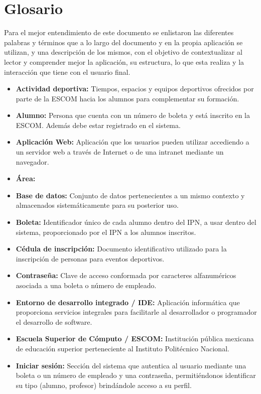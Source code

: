 \chapter*{Glosario}
	Para el mejor entendimiento de este documento se enlistaron las diferentes palabras y términos que a lo largo del documento y en la propia aplicación se utilizan, y una descripción de los mismos, con el objetivo de contextualizar al lector y comprender mejor la aplicación, su estructura, lo que esta realiza y la interacción que tiene con el usuario final.
	\begin{itemize}
		\item \textbf{Actividad deportiva:} Tiempos, espacios y equipos deportivos ofrecidos por parte de la ESCOM hacia los alumnos para complementar su formación.
		\item \textbf{Alumno:} Persona que cuenta con un número de boleta y está inscrito en la ESCOM. Además debe estar registrado en el sistema. 
		\item \textbf{Aplicación Web:} Aplicación que los usuarios pueden utilizar accediendo a un servidor web a través de Internet o de una intranet mediante un navegador.
		\item \textbf{Área:}
		\item \textbf{Base de datos:} Conjunto de datos pertenecientes a un mismo contexto y almacenados sistemáticamente para su posterior uso. 
		\item \textbf{Boleta:} Identificador único de cada alumno dentro del IPN, a usar dentro del sistema, proporcionado por el IPN a los alumnos inscritos. 
		\item \textbf{Cédula de inscripción:} Documento identificativo utilizado para la inscripción de personas para eventos deportivos.
		\item \textbf{Contraseña:} Clave de acceso conformada por caracteres alfanuméricos asociada a una boleta o número de empleado.
		\item \textbf{Entorno de desarrollo integrado / IDE:} Aplicación informática que proporciona servicios integrales para facilitarle al desarrollador o programador el desarrollo de software. 
		\item \textbf{Escuela Superior de Cómputo / ESCOM:}  Institución pública mexicana de educación superior perteneciente al Instituto Politécnico Nacional. 
		\item \textbf{Iniciar sesión:} Sección del sistema que autentica al usuario mediante una boleta o un número de empleado y una contraseña, permitiéndonos identificar su tipo (alumno, profesor) brindándole acceso a su perfil. 

\end{itemize}
